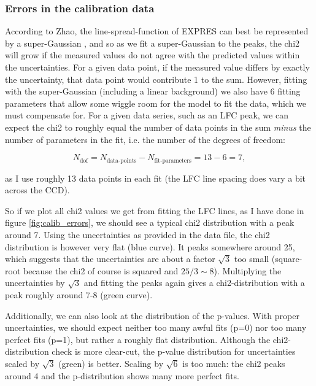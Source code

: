     \subsubsection{Errors in the calibration data}

    According to Zhao, the line-spread-function of EXPRES can best be represented by a super-Gaussian \cite{yale_data}, and so as we fit a super-Gaussian to the peaks, the chi2 will grow if the measured values do not agree with the predicted values within the uncertainties. For a given data point, if the measured value differs by exactly the uncertainty, that data point would contribute 1 to the sum. However, fitting with the super-Gaussian (including a linear background) we also have 6 fitting parameters that allow some wiggle room for the model to fit the data, which we must compensate for. For a given data series, such as an LFC peak, we can expect the chi2 to roughly equal the number of data points in the sum \emph{minus} the number of parameters in the fit, i.e. the number of the degrees of freedom:
    
    \begin{equation}
        \label{eq:ndof}
        N_\text{dof} = N_\text{data-points} - N_\text{fit-parameters} =  13 - 6 = 7,
    \end{equation}

    as I use roughly 13 data points in each fit (the LFC line spacing does vary a bit across the CCD). 

    So if we plot all chi2 values we get from fitting the LFC lines, as I have done in figure \ref{fig:calib_errors}, we should see a typical chi2 distribution with a peak around 7. Using the uncertainties as provided in the data file, the chi2 distribution is however very flat (blue curve). It peaks somewhere around 25, which suggests that the uncertainties are about a factor $\sqrt{3}$ too small (square-root because the chi2 of course is squared and $25/3 \sim 8$). Multiplying the uncertainties by $\sqrt{3}$ and fitting the peaks again gives a chi2-distribution with a peak roughly around 7-8 (green curve).

    Additionally, we can also look at the distribution of the p-values. With proper uncertainties, we should expect neither too many awful fits (p=0) nor too many perfect fits (p=1), but rather a roughly flat distribution. Although the chi2-distribution check is more clear-cut, the p-value distribution for uncertainties scaled by $\sqrt{3}$ (green) is better. Scaling by $\sqrt{6}$ is too much: the chi2 peaks around 4 and the p-distribution shows many more perfect fits.
                

